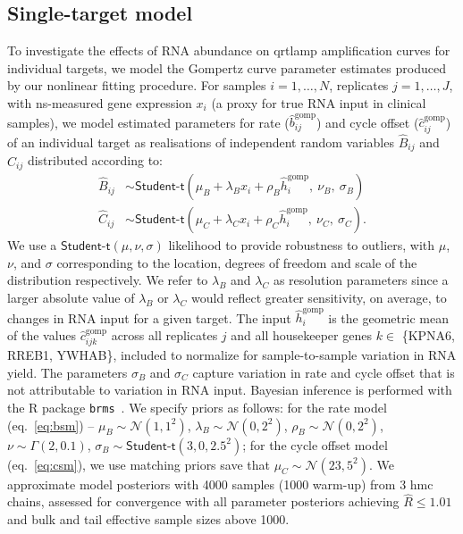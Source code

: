 \documentclass[../thesis.tex]{subfiles}
\begin{document}
\subsection{Single-target model \label{sec:singletargetmodel}}
To investigate the effects of RNA abundance on \gls{qrtlamp} amplification curves for individual targets, we model the Gompertz curve parameter estimates produced by our nonlinear fitting procedure. For samples $i = 1, \dots, N$, replicates $j = 1, \dots, J$, with \gls{ns}-measured gene expression $x_i$ (a proxy for true RNA input in clinical samples), we model estimated parameters for rate ($\hat{b}_{ij}^{\text{gomp}}$) and cycle offset ($\hat{c}_{ij}^{\text{gomp}}$) of an individual target as realisations of independent random variables $\hat{B}_{ij}$ and $\hat{C}_{ij}$ distributed according to:
\begin{align} 
    \hat{B}_{ij} & \sim \textsf{Student-t}(\mu_B + \lambda_B x_i + \rho_B \hat{h}^{\text{gomp}}_i, \ \nu_B, \ \sigma_B ) \label{eq:bsm}\\
    \hat{C}_{ij} & \sim \textsf{Student-t}(\mu_C + \lambda_C x_i + \rho_C \hat{h}^{\text{gomp}}_i, \ \nu_C, \ \sigma_C). \label{eq:csm}
\end{align}
We use a $\textsf{Student-t}(\mu,\nu,\sigma)$ likelihood to provide robustness to outliers, with $\mu$, $\nu$, and $\sigma$ corresponding to the location, degrees of freedom and scale of the distribution respectively. We refer to $\lambda_B$ and $\lambda_C$ as resolution parameters since a larger absolute value of $\lambda_B$ or $\lambda_C$ would reflect greater sensitivity, on average, to changes in RNA input for a given target.
The input $\hat{h}^{\text{gomp}}_{i}$ is the geometric mean of the values $\hat{c}_{ijk}^{\text{gomp}}$ across all replicates $j$ and all housekeeper genes  $k \in$ \{KPNA6, RREB1, YWHAB\}, included to normalize for sample-to-sample variation in RNA yield. The parameters $\sigma_B$ and $\sigma_C$ capture variation in rate and cycle offset that is not attributable to variation in RNA input. Bayesian inference is performed with the R package \texttt{brms}~\citep{burkner_brms_2017}. We specify priors as follows: for the rate model (eq.~\ref{eq:bsm}) -- $\mu_B \sim \mathcal{N}(1, 1^2)$, $\lambda_B \sim \mathcal{N}(0, 2^2)$, $\rho_B \sim \mathcal{N}(0, 2^2)$, $\nu \sim \Gamma(2,0.1)$, $\sigma_B \sim \textsf{Student-t}(3, 0, 2.5^2)$; for the cycle offset model (eq.~\ref{eq:csm}), we use matching priors save that $\mu_C \sim \mathcal{N}(23, 5^2)$. We approximate model posteriors with 4000 samples (1000 warm-up) from 3 \gls{hmc} chains, assessed for convergence with all parameter posteriors achieving $\hat{R} \leq 1.01$ and bulk and tail effective sample sizes above 1000.
\end{document}

